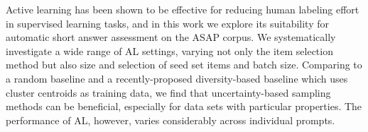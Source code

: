Active learning has been shown to be effective for reducing human labeling effort in supervised learning tasks, and in this work we explore its suitability for automatic short answer assessment on the ASAP corpus. We systematically investigate a wide range of AL settings, varying not only the item selection method but also size and selection of seed set items and batch size. Comparing to a random baseline and a recently-proposed diversity-based baseline which uses cluster centroids as training data, we find that uncertainty-based sampling methods can be beneficial, especially for data sets with particular properties. The performance of AL, however, varies considerably across individual prompts.
